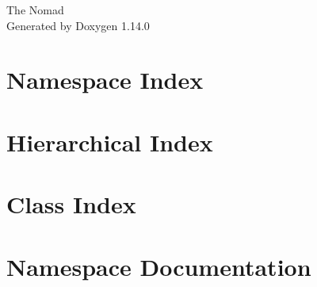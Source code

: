 \documentclass[twoside]{book}
\newcommand{\+}{\discretionary{\mbox{\scriptsize$\hookleftarrow$}}{}{}}
\newcommand{\clearemptydoublepage}{%
    \newpage{\pagestyle{empty}\cleardoublepage}%
  }
\begin{document}
  \raggedbottom
    \hypersetup{pageanchor=false,
                bookmarksnumbered=true,
                pdfencoding=unicode
               }
  \begin{titlepage}
  \vspace*{7cm}
  \begin{center}%
  {\Large The Nomad}\\
  \vspace*{1cm}
  {\large Generated by Doxygen 1.14.0}\\
  \end{center}
  \end{titlepage}
  \clearemptydoublepage
  \tableofcontents
  \clearemptydoublepage
  \hypersetup{pageanchor=true}
\chapter{Namespace Index}

\chapter{Hierarchical Index}

\chapter{Class Index}

\chapter{Namespace Documentation}





































\end{document}
